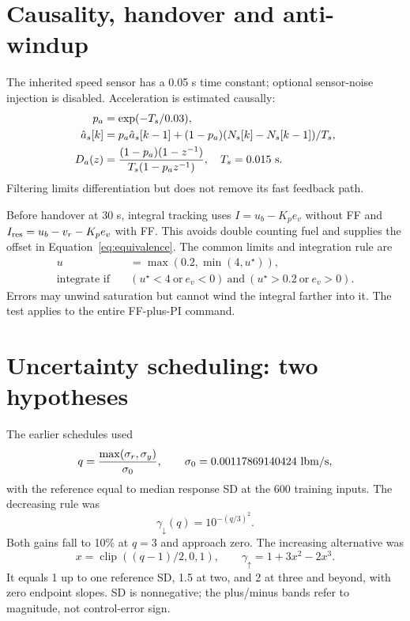 \documentclass[11pt,a4paper]{article}
\begin{document}
\section{Causality, handover and anti-windup}
The inherited speed sensor has a 0.05 s time constant; optional sensor-noise injection is disabled. Acceleration is estimated causally:
\begin{align}
p_a&=\exp(-T_s/0.03),\\
\hat a_s[k]&=p_a\hat a_s[k-1]+(1-p_a)(N_s[k]-N_s[k-1])/T_s,\\
D_a(z)&=\frac{(1-p_a)(1-z^{-1})}{T_s(1-p_az^{-1})},\quad T_s=0.015\ {\rm s}.
\end{align}
Filtering limits differentiation but does not remove its fast feedback path.

Before handover at 30 s, integral tracking uses $I=u_b-K_pe_v$ without FF and $I_{\rm res}=u_b-v_r-K_pe_v$ with FF. This avoids double counting fuel and supplies the offset in Equation~\eqref{eq:equivalence}. The common limits and integration rule are
\begin{align}
u&=\max(0.2,\min(4,u^\star)),\\
\text{integrate if}\quad&
(u^\star<4\ \text{or}\ e_v<0)\ \text{and}\
(u^\star>0.2\ \text{or}\ e_v>0).
\end{align}
Errors may unwind saturation but cannot wind the integral farther into it. The test applies to the entire FF-plus-PI command.

\section{Uncertainty scheduling: two hypotheses}
The earlier schedules used
\begin{equation}
q=\frac{\max(\sigma_r,\sigma_y)}{\sigma_0},\qquad \sigma_0=0.00117869140424\ {\rm lbm/s},
\end{equation}
with the reference equal to median response SD at the 600 training inputs. The decreasing rule was
\begin{equation}\gamma_\downarrow(q)=10^{-(q/3)^2}.\end{equation}
Both gains fall to 10\% at $q=3$ and approach zero. The increasing alternative was
\begin{equation}
x=\operatorname{clip}((q-1)/2,0,1),\qquad \gamma_\uparrow=1+3x^2-2x^3.
\end{equation}
It equals 1 up to one reference SD, 1.5 at two, and 2 at three and beyond, with zero endpoint slopes. SD is nonnegative; the plus/minus bands refer to magnitude, not control-error sign.
\end{document}
